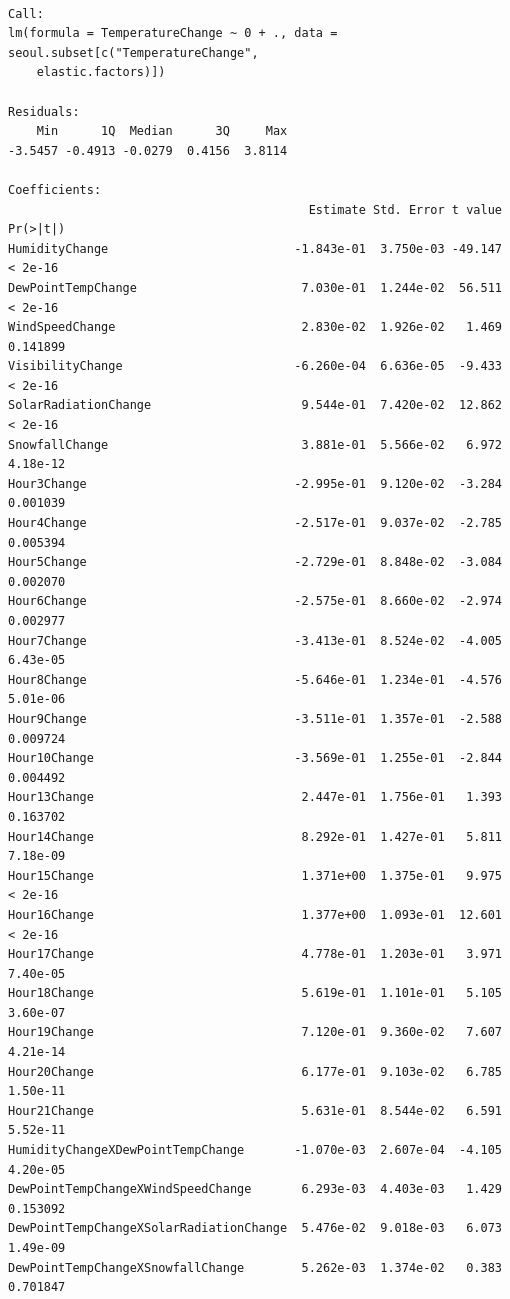 \documentclass[
  letterpaper,
  DIV=11,
  numbers=noendperiod]{scrartcl}
\begin{document}
\begin{verbatim}

Call:
lm(formula = TemperatureChange ~ 0 + ., data = seoul.subset[c("TemperatureChange", 
    elastic.factors)])

Residuals:
    Min      1Q  Median      3Q     Max 
-3.5457 -0.4913 -0.0279  0.4156  3.8114 

Coefficients:
                                          Estimate Std. Error t value Pr(>|t|)
HumidityChange                          -1.843e-01  3.750e-03 -49.147  < 2e-16
DewPointTempChange                       7.030e-01  1.244e-02  56.511  < 2e-16
WindSpeedChange                          2.830e-02  1.926e-02   1.469 0.141899
VisibilityChange                        -6.260e-04  6.636e-05  -9.433  < 2e-16
SolarRadiationChange                     9.544e-01  7.420e-02  12.862  < 2e-16
SnowfallChange                           3.881e-01  5.566e-02   6.972 4.18e-12
Hour3Change                             -2.995e-01  9.120e-02  -3.284 0.001039
Hour4Change                             -2.517e-01  9.037e-02  -2.785 0.005394
Hour5Change                             -2.729e-01  8.848e-02  -3.084 0.002070
Hour6Change                             -2.575e-01  8.660e-02  -2.974 0.002977
Hour7Change                             -3.413e-01  8.524e-02  -4.005 6.43e-05
Hour8Change                             -5.646e-01  1.234e-01  -4.576 5.01e-06
Hour9Change                             -3.511e-01  1.357e-01  -2.588 0.009724
Hour10Change                            -3.569e-01  1.255e-01  -2.844 0.004492
Hour13Change                             2.447e-01  1.756e-01   1.393 0.163702
Hour14Change                             8.292e-01  1.427e-01   5.811 7.18e-09
Hour15Change                             1.371e+00  1.375e-01   9.975  < 2e-16
Hour16Change                             1.377e+00  1.093e-01  12.601  < 2e-16
Hour17Change                             4.778e-01  1.203e-01   3.971 7.40e-05
Hour18Change                             5.619e-01  1.101e-01   5.105 3.60e-07
Hour19Change                             7.120e-01  9.360e-02   7.607 4.21e-14
Hour20Change                             6.177e-01  9.103e-02   6.785 1.50e-11
Hour21Change                             5.631e-01  8.544e-02   6.591 5.52e-11
HumidityChangeXDewPointTempChange       -1.070e-03  2.607e-04  -4.105 4.20e-05
DewPointTempChangeXWindSpeedChange       6.293e-03  4.403e-03   1.429 0.153092
DewPointTempChangeXSolarRadiationChange  5.476e-02  9.018e-03   6.073 1.49e-09
DewPointTempChangeXSnowfallChange        5.262e-03  1.374e-02   0.383 0.701847

\end{verbatim}
\end{document}
